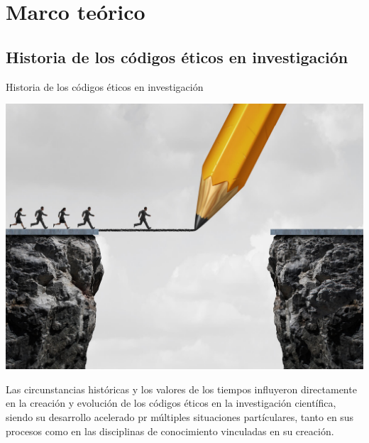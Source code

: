 \section{Marco teórico}
\subsection{Historia de los códigos éticos en investigación}
\begin{frame}{Historia de los códigos éticos en investigación}
    \begin{minipage}{0.45\linewidth}
    \includegraphics[scale=0.1]{images/ima4.jpg}
    \end{minipage}
    \begin{minipage}{0.5\linewidth}
    Las circunstancias históricas y los valores de los tiempos influyeron directamente en la creación y evolución
    de los códigos éticos en la investigación científica, siendo su desarrollo acelerado pr múltiples situaciones partículares,
    tanto en sus procesos como en las disciplinas de conocimiento vinculadas en su creación.
\end{minipage}
\end{frame}

